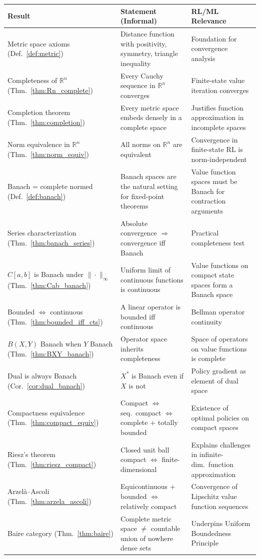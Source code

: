 \documentclass[11pt,a4paper]{article}
\theoremstyle{definition}
\theoremstyle{plain}
\theoremstyle{remark}
\newcommand{\R}{\mathbb{R}}
\begin{document}
\begin{center}
\renewcommand{\arraystretch}{1.4}
\begin{tabular}{@{}p{4.2cm}p{5.5cm}p{4.5cm}@{}}
\toprule
\textbf{Result} & \textbf{Statement (Informal)} & \textbf{RL/ML Relevance} \\
\midrule
Metric space axioms (Def.~\ref{def:metric})
  & Distance function with positivity, symmetry, triangle inequality
  & Foundation for convergence analysis \\
Completeness of $\R^n$ (Thm.~\ref{thm:Rn_complete})
  & Every Cauchy sequence in $\R^n$ converges
  & Finite-state value iteration converges \\
Completion theorem (Thm.~\ref{thm:completion})
  & Every metric space embeds densely in a complete space
  & Justifies function approximation in incomplete spaces \\
Norm equivalence in $\R^n$ (Thm.~\ref{thm:norm_equiv})
  & All norms on $\R^n$ are equivalent
  & Convergence in finite-state RL is norm-independent \\
Banach = complete normed (Def.~\ref{def:banach})
  & Banach spaces are the natural setting for fixed-point theorems
  & Value function spaces must be Banach for contraction arguments \\
Series characterization (Thm.~\ref{thm:banach_series})
  & Absolute convergence $\Rightarrow$ convergence iff Banach
  & Practical completeness test \\
$C[a,b]$ is Banach under $\|\cdot\|_\infty$ (Thm.~\ref{thm:Cab_banach})
  & Uniform limit of continuous functions is continuous
  & Value functions on compact state spaces form a Banach space \\
Bounded $\Leftrightarrow$ continuous (Thm.~\ref{thm:bounded_iff_cts})
  & A linear operator is bounded iff continuous
  & Bellman operator continuity \\
$B(X,Y)$ Banach when $Y$ Banach (Thm.~\ref{thm:BXY_banach})
  & Operator space inherits completeness
  & Space of operators on value functions is complete \\
Dual is always Banach (Cor.~\ref{cor:dual_banach})
  & $X^*$ is Banach even if $X$ is not
  & Policy gradient as element of dual space \\
Compactness equivalence (Thm.~\ref{thm:compact_equiv})
  & Compact $\Leftrightarrow$ seq.\ compact $\Leftrightarrow$ complete + totally bounded
  & Existence of optimal policies on compact spaces \\
Riesz's theorem (Thm.~\ref{thm:riesz_compact})
  & Closed unit ball compact $\Leftrightarrow$ finite-dimensional
  & Explains challenges in infinite-dim.\ function approximation \\
Arzel\`{a}--Ascoli (Thm.~\ref{thm:arzela_ascoli})
  & Equicontinuous + bounded $\Leftrightarrow$ relatively compact
  & Convergence of Lipschitz value function sequences \\
Baire category (Thm.~\ref{thm:baire})
  & Complete metric space $\ne$ countable union of nowhere dense sets
  & Underpins Uniform Boundedness Principle \\
\bottomrule
\end{tabular}
\end{center}
\end{document}
